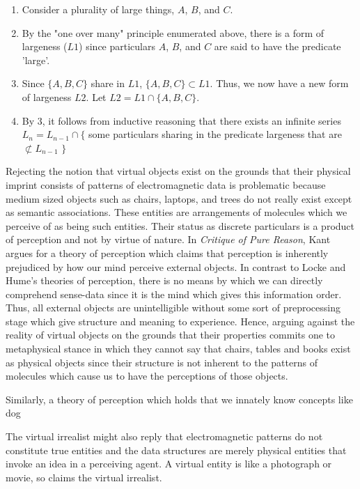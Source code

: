  \begin{enumerate}
 	\item Consider a plurality of large things, $A$, $B$, and $C$.
 	\item By the   "one over many" principle enumerated above, there is a form of largeness ($L1$) since particulars  $A$, $B$, and $C$ are said to have the predicate 'large'.  \cite{plato1921plato}
 	\item Since $\{A,B,C\}$  share in $L1$, $\{A,B,C\} \subset L1$. Thus, we now have a new form of largeness $L2$. Let $L2 =  L1 \cap \{A,B,C\}$.
	\item By $3$, it follows from inductive reasoning that there  exists an infinite series $L_{n} = L_{n-1} \cap \{$ some particulars sharing in the predicate largeness that are $\not\subset L_{n-1}$ $\}$	
 \end{enumerate}
Rejecting the notion that virtual objects exist on the grounds that their physical imprint consists of patterns of electromagnetic data is problematic because medium sized objects such as chairs, laptops, and trees do not really exist except as semantic associations. These entities are arrangements of molecules which we perceive of as being such entities. Their status as discrete particulars is a product of perception and not by virtue of nature. In \textit{Critique of Pure Reason}, Kant argues for a theory of perception which claims that perception is inherently prejudiced by how our mind perceive external objects. In contrast to Locke and Hume's theories of perception, there is no means by which we can directly comprehend sense-data since it is the mind which gives this information order. \cite{thomson2012bacon} Thus, all external objects are unintelligible without some sort of preprocessing stage which give structure and meaning to experience. Hence, arguing against the reality of virtual objects on the grounds that their properties commits one to metaphysical stance in which they cannot say that chairs, tables and books exist as physical objects since their structure is not inherent to the patterns of molecules which cause us to have the perceptions of those objects.
\newline

Similarly, a theory of perception which holds that we innately know concepts like dog 

 The virtual irrealist might also reply that electromagnetic patterns do not constitute true entities and the data structures are merely physical entities that invoke an idea in a perceiving agent. A virtual entity is like a photograph or movie, so claims the virtual irrealist.   
 \newline 
  
